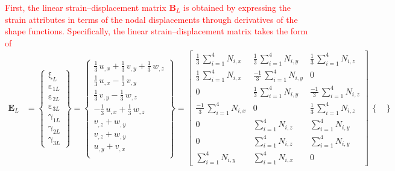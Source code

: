\textcolor{red}{First, the linear strain--displacement matrix $\mathbf{B}_L$ is obtained by expressing the strain attributes in terms of the nodal displacements through derivatives of the shape functions. Specifically, the linear strain--displacement matrix takes the form of}
\begin{equation}
\begin{aligned}
\mathbf{E}_L & =  \begin{Bmatrix}
\mathrm \xi_{L} \\
\mathrm \varepsilon_{1L} \\
\mathrm \varepsilon_{2L} \\
\mathrm \varepsilon_{3L} \\
\mathrm \gamma_{1L} \\
\mathrm \gamma_{2L} \\
\mathrm \gamma_{3L}\end{Bmatrix} = 
\begin{Bmatrix}
\tfrac{1}{3} \, u_{,x} + \tfrac{1}{3} \, v_{,y} + \tfrac{1}{3} \, w_{,z} \\
\tfrac{1}{3} \, u_{,x} - \tfrac{1}{3} \, v_{,y} \\
\tfrac{1}{3} \, v_{,y} - \tfrac{1}{3} \, w_{,z} \\
- \tfrac{1}{3} \, u_{,x} + \tfrac{1}{3} \, w_{,z} \\ 
v_{,z} +  w_{,y} \\ 
v_{,z} +  w_{,y} \\ 
u_{,y} +  v_{,x} \\\end{Bmatrix} = \begin{bmatrix}
\tfrac{1}{3} \, \sum\nolimits_{i=1}^4 N_{i,x}  & \tfrac{1}{3} \, \sum\nolimits_{i=1}^4 N_{i,y} & \tfrac{1}{3} \, \sum\nolimits_{i=1}^4 N_{i,z} \\
\tfrac{1}{3} \, \sum\nolimits_{i=1}^4 N_{i,x}  & \tfrac{-1}{3} \, \sum\nolimits_{i=1}^4 N_{i,y} & 0 \\ 0 & \tfrac{1}{3} \, \sum\nolimits_{i=1}^4 N_{i,y}  &  \tfrac{-1}{3} \, \sum\nolimits_{i=1}^4 N_{i,z} \\  \tfrac{-1}{3} \, \sum\nolimits_{i=1}^4 N_{i,x}  & 0 & \tfrac{1}{3} \, \sum\nolimits_{i=1}^4 N_{i,z} \\ 0 & \sum\nolimits_{i=1}^4 N_{i,z}  &  \sum\nolimits_{i=1}^4 N_{i,y} \\ 0 & \sum\nolimits_{i=1}^4 N_{i,z}  &  \sum\nolimits_{i=1}^4 N_{i,y} \\ \sum\nolimits_{i=1}^4 N_{i,y}  &  \sum\nolimits_{i=1}^4 N_{i,x} & 0 \end{bmatrix} \, \begin{Bmatrix}

\end{Bmatrix}
\end{aligned}
\end{equation}

